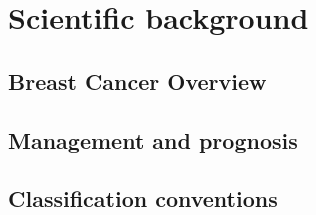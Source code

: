 


\section{Scientific background}

    \subsection{Breast Cancer Overview}
    
    
    
        

        \subsection{Management and prognosis}
        \subsection{Classification conventions}
